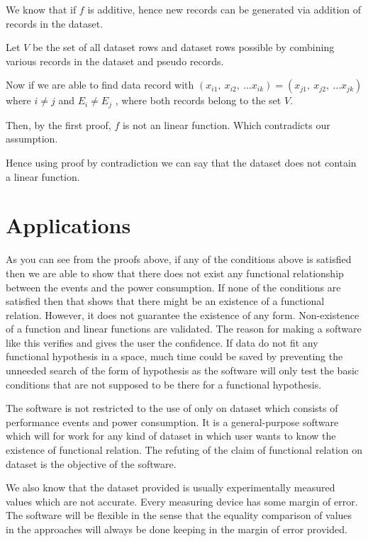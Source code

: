 We know that if \(f\) is additive, hence new records can be generated via addition of records in the dataset.

Let \(V\) be the set of all dataset rows and dataset rows possible by combining various records in the dataset and pseudo records.

Now if we are able to find data record with \((x_{i1},\ x_{i2},\ \ldots x_{ik}) = (x_{j1},\ x_{j2},\ \ldots x_{jk})\) where \(i \neq j\) and \(E_i \neq E_j\) , where both records belong to the set \(V\).

Then, by the first proof, \(f\) is not an linear function. Which contradicts our assumption.

Hence using proof by contradiction we can say that the dataset does not contain a linear function.

\section{Applications}

As you can see from the proofs above, if any of the conditions above is satisfied then we are able to show that there does not exist any functional relationship between the events and the power consumption. If none of the conditions are satisfied then that shows that there might be an existence of a functional relation. However, it does not guarantee the existence of any form. Non-existence of a function and linear functions are validated. The reason for making a software like this verifies and gives the user the confidence. If data do not fit any functional hypothesis in a space, much time could be saved by preventing the unneeded search of the form of hypothesis as the software will only test the basic conditions that are not supposed to be there for a functional hypothesis.

The software is not restricted to the use of only on dataset which consists of performance events and power consumption. It is a general-purpose software which will for work for any kind of dataset in which user wants to know the existence of functional relation. The refuting of the claim of functional relation on dataset is the objective of the software.

We also know that the dataset provided is usually experimentally measured values which are not accurate. Every measuring device has some margin of error. The software will be flexible in the sense that the equality comparison of values in the approaches will always be done keeping in the margin of error provided.
